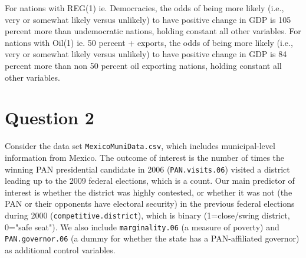 \documentclass[12pt,letterpaper]{article}
\begin{document}
\begin{enumerate}
For nations with REG(1) ie. Democracies, the odds of being more likely (i.e., very or somewhat likely versus unlikely) to have positive change in GDP is 105 percent more than undemocratic nations, holding constant all other variables.
For nations with Oil(1) ie. 50 percent + exports, the odds of being more likely (i.e., very or somewhat likely versus unlikely) to have positive change in GDP is 84 percent more than non 50 percent oil exporting nations, holding constant all other variables.

	
\end{enumerate}

\section*{Question 2} 
\vspace{.25cm}

\noindent Consider the data set \texttt{MexicoMuniData.csv}, which includes municipal-level information from Mexico. The outcome of interest is the number of times the winning PAN presidential candidate in 2006 (\texttt{PAN.visits.06}) visited a district leading up to the 2009 federal elections, which is a count. Our main predictor of interest is whether the district was highly contested, or whether it was not (the PAN or their opponents have electoral security) in the previous federal elections during 2000 (\texttt{competitive.district}), which is binary (1=close/swing district, 0="safe seat"). We also include \texttt{marginality.06} (a measure of poverty) and \texttt{PAN.governor.06} (a dummy for whether the state has a PAN-affiliated governor) as additional control variables. 
\end{document}

